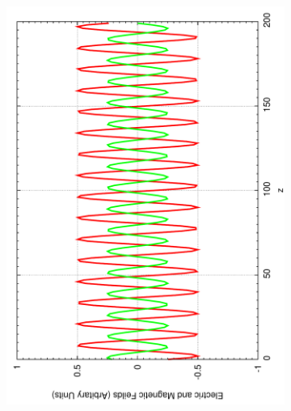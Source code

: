 \begin{figure}[ht]
\begin{subfigure}[ht]{0.45\textwidth}
        \end{subfigure}%
        ~
        \begin{subfigure}[ht]{0.45\textwidth}
                \centering
                \includegraphics[angle=270, width=\textwidth]{highfreqsine2.pdf}
        \end{subfigure}


\end{figure}
